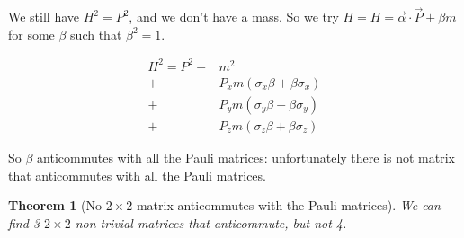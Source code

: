 \documentclass[]{article}
\newtheorem{thm}{Theorem}
\begin{document}
We still have $H^2=P^2$, and we don't have a mass. So we try $H= H = \vec{\alpha} \cdot \vec{P}+\beta m$ for some $\beta$ such that $\beta^2=1$.

\begin{align*}
	H^2 = P^2 +& m^2 \\
	+& P_x m (\sigma_x \beta + \beta \sigma_x) \\
	+& P_y m (\sigma_y \beta + \beta \sigma_y) \\
	+& P_z m (\sigma_z \beta + \beta \sigma_z)
\end{align*}

So $\beta$ anticommutes with all the Pauli matrices: unfortunately there is not matrix that anticommutes with all the Pauli matrices.

\begin{thm}[No $2 \times 2$ matrix  anticommutes with the Pauli matrices]
	We can find 3 $2 \times 2$ non-trivial matrices that anticommute, but not 4.
\end{thm}
\end{document}
